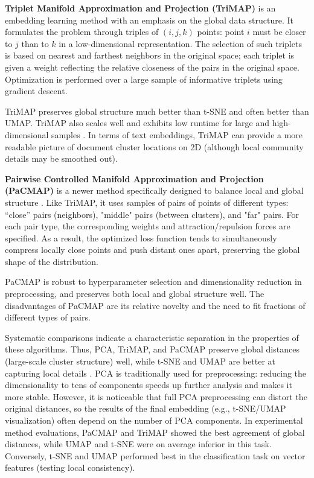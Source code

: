 \textbf{Triplet Manifold Approximation and Projection (TriMAP)} is an embedding learning method with an emphasis
on the global \parencite{TRIMAP2019} data structure. It formulates the problem through triples of $(i,j,k)$
points: point $i$ must be closer to $j$ than to $k$ in a low-dimensional representation. The selection
of such triplets is based on nearest and farthest neighbors in the original space; each triplet is given
a weight reflecting the relative closeness of the pairs in the original space. Optimization is performed over
a large sample of informative triplets using gradient descent.

TriMAP preserves global structure much better than t-SNE and often better than UMAP. TriMAP also scales well
and exhibits low runtime for large and high-dimensional samples \parencite{TRIMAP2019}. In terms of text embeddings,
TriMAP can provide a more readable picture of document cluster locations on 2D (although local community details
may be smoothed out).

\textbf{Pairwise Controlled Manifold Approximation and Projection (PaCMAP)} is a newer method specifically designed
to balance local and global structure \parencite{PACMAP2021}. Like TriMAP, it uses samples of pairs of points
of different types: “close” pairs (neighbors), "middle" pairs (between clusters), and "far" pairs. For each
pair type, the corresponding weights and attraction/repulsion forces are specified. As a result, the optimized
loss function tends to simultaneously compress locally close points and push distant ones apart, preserving
the global shape of the distribution.

PaCMAP is robust to hyperparameter selection and dimensionality reduction in preprocessing, and preserves both
local and global structure well. The disadvantages of PaCMAP are its relative novelty and the need to fit
fractions of different types of pairs.

Systematic comparisons indicate a characteristic separation in the properties of these algorithms. Thus, PCA,
TriMAP, and PaCMAP preserve global distances (large-scale cluster structure) well, while t-SNE and UMAP are better
at capturing local details \parencite{huang2022towards}. PCA is traditionally used for preprocessing: reducing
the dimensionality to tens of components speeds up further analysis and makes it more stable. However, it is
noticeable that full PCA preprocessing can distort the original distances, so the results of the final embedding
(e.g., t-SNE/UMAP visualization) often depend on the number of PCA components. In experimental method evaluations,
PaCMAP and TriMAP showed the best agreement of global distances, while UMAP and t-SNE were on average inferior
in this task. Conversely, t-SNE and UMAP performed best in the classification task on vector features (testing
local consistency).

